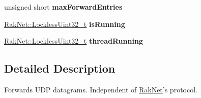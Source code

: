 \begin{DoxyCompactItemize}
\item 
\hypertarget{class_rak_net_1_1_u_d_p_forwarder_a56b25f1c2ebd11ad670bd9db25e325a8}{unsigned short {\bfseries max\-Forward\-Entries}}\label{class_rak_net_1_1_u_d_p_forwarder_a56b25f1c2ebd11ad670bd9db25e325a8}

\item 
\hypertarget{class_rak_net_1_1_u_d_p_forwarder_a61fe950806182f696b13e4ea8ae747c8}{\hyperlink{class_rak_net_1_1_lockless_uint32__t}{Rak\-Net\-::\-Lockless\-Uint32\-\_\-t} {\bfseries is\-Running}}\label{class_rak_net_1_1_u_d_p_forwarder_a61fe950806182f696b13e4ea8ae747c8}

\item 
\hypertarget{class_rak_net_1_1_u_d_p_forwarder_a2d702d07788e0491505f8f39905862be}{\hyperlink{class_rak_net_1_1_lockless_uint32__t}{Rak\-Net\-::\-Lockless\-Uint32\-\_\-t} {\bfseries thread\-Running}}\label{class_rak_net_1_1_u_d_p_forwarder_a2d702d07788e0491505f8f39905862be}

\end{DoxyCompactItemize}


\subsection{Detailed Description}
Forwards U\-D\-P datagrams. Independent of \hyperlink{namespace_rak_net}{Rak\-Net}'s protocol. 


